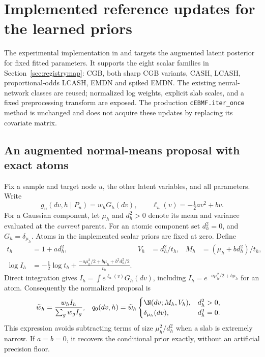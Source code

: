 \section{Implemented reference updates for the learned priors}
\label{sec:implemented}
The experimental implementation in
 and
 targets the augmented latent
posterior for fixed fitted parameters. It supports the eight scalar
families in Section~\ref{sec:registrymap}: CGB, both sharp CGB variants,
CASH, LCASH, proportional-odds LCASH, EMDN and spiked EMDN.
The existing neural-network classes are reused; normalized log weights,
explicit slab scales, and a fixed preprocessing transform are exposed.
The production \texttt{cEBMF.iter\_once} method is unchanged and does not
acquire these updates by replacing its covariate matrix.

\subsection{An augmented normal-means proposal with exact atoms}
Fix a sample and target node \(u\), the other latent variables, and all
parameters. Write
\[
g_u(dv,h\mid P_u)=w_hG_h(dv),\qquad
\ell_u(v)=-\tfrac12av^2+bv.
\]
For a Gaussian component, let \(\mu_h\) and \(d_h^2>0\) denote its mean
and variance evaluated at the \emph{current} parents. For an atomic
component set \(d_h^2=0\), and \(G_h=\delta_{\mu_h}\). Atoms in the
implemented scalar priors are fixed at zero. Define
\begin{align}
t_h&=1+ad_h^2,&
V_h&=d_h^2/t_h,&
M_h&=(\mu_h+bd_h^2)/t_h,\\
\log I_h
&=-\tfrac12\log t_h+
\frac{-a\mu_h^2/2+b\mu_h+b^2d_h^2/2}{t_h}.
\label{eq:stableproposal}
\end{align}
Direct integration gives
\(I_h=\int e^{\ell_u(v)}G_h(dv)\), including
\(I_h=e^{-a\mu_h^2/2+b\mu_h}\) for an atom.
Consequently the normalized proposal is
\begin{align}
\widetilde w_h
&=\frac{w_hI_h}{\sum_gw_gI_g},&
q_0(dv,h)
&=\widetilde w_h
\begin{cases}
\N(dv;M_h,V_h),&d_h^2>0,\\
\delta_{\mu_h}(dv),&d_h^2=0.
\end{cases}
\label{eq:implementedproposal}
\end{align}
This expression avoids subtracting terms of size \(\mu_h^2/d_h^2\)
when a slab is extremely narrow. If \(a=b=0\), it recovers the conditional
prior exactly, without an artificial precision floor.


